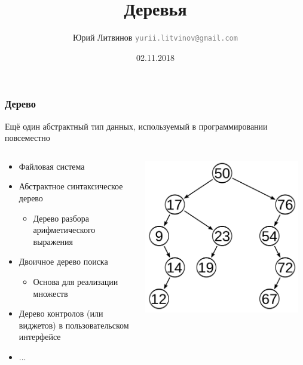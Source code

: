 \documentclass[xetex,mathserif,serif]{beamer}
\title{Деревья}
\author[Юрий Литвинов]{Юрий Литвинов \newline \textcolor{gray}{\small\texttt{yurii.litvinov@gmail.com}}}
\date{02.11.2018}
\begin{document}
	
	\frame{\titlepage}
	
	\begin{frame}
		\frametitle{Дерево}
		Ещё один абстрактный тип данных, используемый в программировании повсеместно
		\begin{columns}
			\begin{column}{0.55\textwidth}
				\begin{itemize}
					\item Файловая система
					\item Абстрактное синтаксическое дерево
					\begin{itemize}
						\item Дерево разбора арифметического выражения
					\end{itemize}
					\item Двоичное дерево поиска
					\begin{itemize}
						\item Основа для реализации множеств
					\end{itemize}
					\item Дерево контролов (или виджетов) в пользовательском интерфейсе
					\item ...
				\end{itemize}
			\end{column}
			\begin{column}{0.45\textwidth}
				\begin{center}
					\includegraphics[width=0.95\textwidth]{tree.png}
				\end{center}
			\end{column}
		\end{columns}
	\end{frame}
\end{document}
